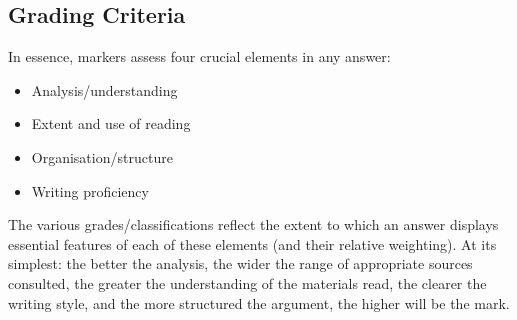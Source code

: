 \subsection*{Grading Criteria}

In essence, markers assess four crucial elements in any answer:

\begin{itemize}
	\item Analysis/understanding
	\item Extent and use of reading
	\item Organisation/structure
	\item Writing proficiency
\end{itemize}

	The various grades/classifications reflect the extent to which an answer displays essential features of each of these elements (and their relative weighting). At its simplest: the better the analysis, the wider the range of appropriate sources consulted, the greater the understanding of the materials read, the clearer the writing style, and the more structured the argument, the higher will be the mark. 
